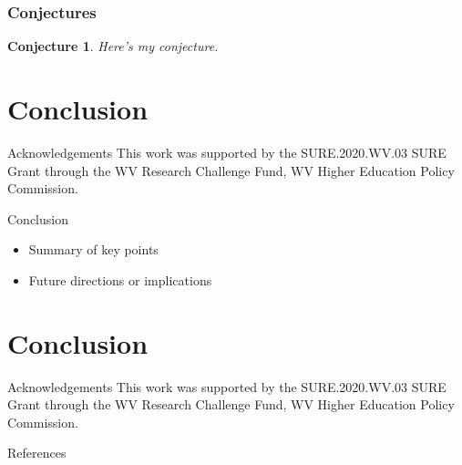 \documentclass{beamer}
\newtheorem{conjecture}{Conjecture}
\begin{document}
\begin{frame}
    \frametitle{Conjectures}
	\begin{conjecture}
	Here's my conjecture.
	\end{conjecture}

\end{frame}

\section{Conclusion}
\begin{frame}{Acknowledgements}
    This work was supported by the SURE.2020.WV.03 SURE Grant through the WV Research Challenge Fund, WV Higher Education Policy Commission.
\end{frame}

\begin{frame}{Conclusion}
  \begin{itemize}
    \item Summary of key points
    \item Future directions or implications
  \end{itemize}
\end{frame}

\section{Conclusion}
\begin{frame}{Acknowledgements}
    This work was supported by the SURE.2020.WV.03 SURE Grant through the WV Research Challenge Fund, WV Higher Education Policy Commission.
\end{frame}


\begin{frame}{References}
  
    \printbibliography

\end{frame}
\end{document}
